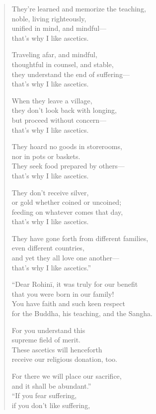 \documentclass[12pt,openany]{book}%
\begin{document}
\begin{verse}
They’re learned and memorize the teaching, \\
noble, living righteously, \\
unified in mind, and mindful—\\
that’s why I like ascetics. 

Traveling afar, and mindful, \\
thoughtful in counsel, and stable, \\
they understand the end of suffering—\\
that’s why I like ascetics. 

When they leave a village, \\
they don’t look back with longing, \\
but proceed without concern—\\
that’s why I like ascetics. 

They hoard no goods in storerooms, \\
nor in pots or baskets. \\
They seek food prepared by others—\\
that’s why I like ascetics. 

They don’t receive silver, \\
or gold whether coined or uncoined; \\
feeding on whatever comes that day, \\
that’s why I like ascetics. 

They have gone forth from different families, \\
even different countries, \\
and yet they all love one another—\\
that’s why I like ascetics.” 

“Dear \textsanskrit{Rohinī}, it was truly for our benefit \\
that you were born in our family! \\
You have faith and such keen respect \\
for the Buddha, his teaching, and the Sangha. 

For you understand this \\
supreme field of merit. \\
These ascetics will henceforth \\
receive our religious donation, too. 

For there we will place our sacrifice, \\
and it shall be abundant.” \\
“If you fear suffering, \\
if you don’t like suffering, 


\end{verse}
\end{document}
